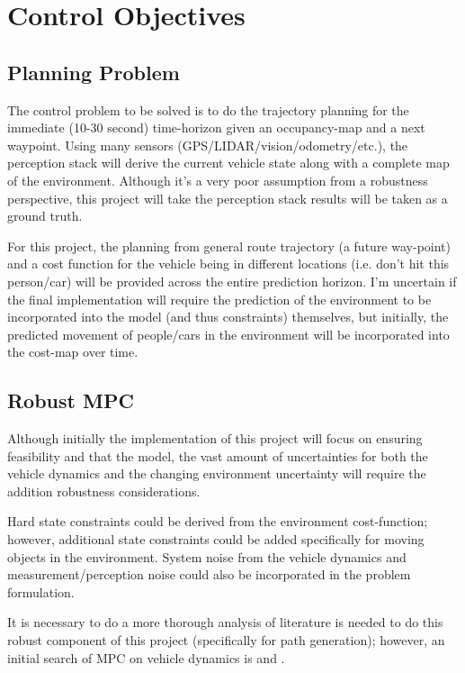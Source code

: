 \documentclass[9pt, onecolumn]{report}
\begin{document}
\section*{Control Objectives}
\subsection*{Planning Problem}
The control problem to be solved is to do the trajectory planning for the immediate (10-30 second) time-horizon given an occupancy-map and a next waypoint.
Using many sensors (GPS/LIDAR/vision/odometry/etc.), the perception stack will derive the current vehicle state along with a complete map of the environment.
Although it's a very poor assumption from a robustness perspective, this project will take the perception stack results will be taken as a ground truth.

For this project, the planning from general route trajectory (a future way-point) and a cost function for the vehicle being in different locations (i.e. don't hit this person/car) will be provided across the entire prediction horizon.
I'm uncertain if the final implementation will require the prediction of the environment to be incorporated into the model (and thus constraints) themselves, but initially, the predicted movement of people/cars in the environment will be incorporated into the cost-map over time.

\subsection*{Robust MPC}
Although initially the implementation of this project will focus on ensuring feasibility and that the model, the vast amount of uncertainties for both the vehicle dynamics and the changing environment uncertainty will require the addition robustness considerations.

Hard state constraints could be derived from the environment cost-function; however, additional state constraints could be added specifically for moving objects in the environment.
System noise from the vehicle dynamics and measurement/perception noise could also be incorporated in the problem formulation.

It is necessary to do a more thorough analysis of literature is needed to do this robust component of this project (specifically for path generation); however, an initial search of MPC on vehicle dynamics is \cite{MPC_PathTracking} and \cite{reachAnalysis_SafetyAssessment}.
\end{document}

